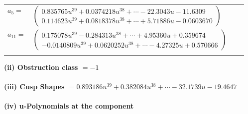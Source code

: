 \documentclass[1p]{elsarticle_modified}
\theoremstyle{definition}
\begin{document}
\begin{tabular}{m{7pt} m{180pt} m{7pt} m{180pt} }
\flushright $a_{5}=$&$\begin{pmatrix}0.835765 u^{39}+0.0374218 u^{38}+\cdots-22.3043 u-11.6309\\0.114623 u^{39}+0.0818378 u^{38}+\cdots+5.71886 u-0.0603670\end{pmatrix}$ \\
\flushright $a_{11}=$&$\begin{pmatrix}0.175078 u^{39}-0.284313 u^{38}+\cdots+4.95360 u+0.359674\\-0.0140809 u^{39}+0.0620252 u^{38}+\cdots-4.27325 u+0.570666\end{pmatrix}$\\&\end{tabular}
\flushleft \textbf{(ii) Obstruction class $= -1$}\\~\\
\flushleft \textbf{(iii) Cusp Shapes $= 0.893186 u^{39}+0.382084 u^{38}+\cdots-32.1739 u-19.4647$}\\~\\
\newpage\renewcommand{\arraystretch}{1}
\flushleft \textbf{(iv) u-Polynomials at the component}\newline \\
\end{document}
